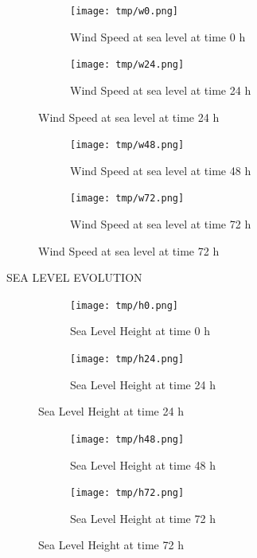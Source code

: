 \documentclass[a4paper]{article}
\renewcommand{\\}{\ {\large\textperiodcentered}\ }
\renewcommand{\\}{\ {\large\textperiodcentered}\ }
\begin{document}
\begin{figure}[h]
\centering
\begin{subfigure}{.5\textwidth}
  \centering
  \texttt{[image: tmp/w0.png]}
  \caption*{Wind Speed at sea level at time 0 h}
  \label{fig:sub1}
\end{subfigure}%
\begin{subfigure}{.5\textwidth}
  \centering
  \texttt{[image: tmp/w24.png]}
  \caption*{Wind Speed at sea level at time 24 h}
  \label{fig:sub2}
\end{subfigure}
\label{fig:test}

\end{figure}


\begin{figure}[h]
\centering
\begin{subfigure}{.5\textwidth}
  \centering
  \texttt{[image: tmp/w48.png]}
  \caption*{Wind Speed at sea level at time 48 h}
  \label{fig:sub1}
\end{subfigure}%
\begin{subfigure}{.5\textwidth}
  \centering
  \texttt{[image: tmp/w72.png]}
  \caption*{Wind Speed at sea level at time 72 h}
  \label{fig:sub2}
\end{subfigure}
\label{fig:test}

\end{figure}

\newpage

SEA LEVEL EVOLUTION


\begin{figure}[h]
\centering
\begin{subfigure}{.5\textwidth}
  \centering
  \texttt{[image: tmp/h0.png]}
  \caption*{Sea Level Height at time 0 h}
  \label{fig:sub1}
\end{subfigure}%
\begin{subfigure}{.5\textwidth}
  \centering
  \texttt{[image: tmp/h24.png]}
  \caption*{Sea Level Height at time 24 h}
  \label{fig:sub2}
\end{subfigure}
\label{fig:test}

\end{figure}


\begin{figure}[h]
\centering
\begin{subfigure}{.5\textwidth}
  \centering
  \texttt{[image: tmp/h48.png]}
  \caption*{Sea Level Height at time 48 h}
  \label{fig:sub1}
\end{subfigure}%
\begin{subfigure}{.5\textwidth}
  \centering
  \texttt{[image: tmp/h72.png]}
  \caption*{Sea Level Height at time 72 h}
  \label{fig:sub2}
\end{subfigure}
\label{fig:test}

\end{figure}
\end{document}
